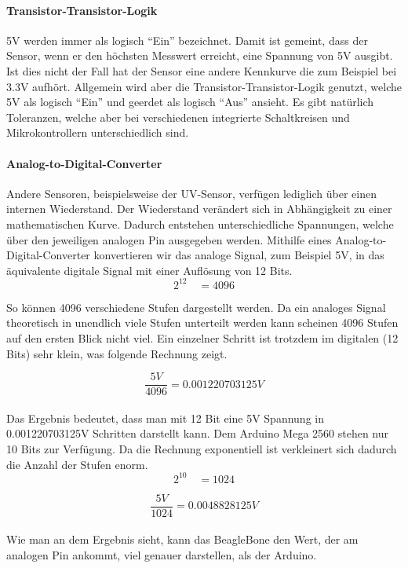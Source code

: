 \paragraph{Transistor-Transistor-Logik}
5V werden immer als logisch ``Ein'' bezeichnet. Damit ist gemeint, dass der Sensor, wenn er den höchsten Messwert erreicht, eine Spannung von 5V ausgibt. Ist dies nicht der Fall hat der Sensor eine andere Kennkurve die zum Beispiel bei 3.3V aufhört. Allgemein wird aber die Transistor-Transistor-Logik genutzt, welche 5V als logisch ``Ein'' und geerdet als logisch ``Aus'' ansieht. Es gibt natürlich Toleranzen, welche aber bei verschiedenen integrierte Schaltkreisen und Mikrokontrollern unterschiedlich sind.

\paragraph{Analog-to-Digital-Converter}
Andere Sensoren, beispielsweise der UV-Sensor, verfügen lediglich über einen internen Wiederstand. Der Wiederstand verändert sich in Abhängigkeit zu einer mathematischen Kurve. Dadurch entstehen unterschiedliche Spannungen, welche über den jeweiligen analogen Pin ausgegeben werden. Mithilfe eines Analog-to-Digital-Converter konvertieren wir das analoge Signal, zum Beispiel 5V, in das äquivalente digitale Signal mit einer Auflösung von 12 Bits. \\

\[
2^{12} \quad = 4096
\]

So können 4096 verschiedene Stufen dargestellt werden. Da ein analoges Signal theoretisch in unendlich viele Stufen unterteilt werden kann scheinen 4096 Stufen auf den ersten Blick nicht viel. Ein einzelner Schritt ist trotzdem im digitalen (12 Bits) sehr klein, was folgende Rechnung zeigt.

\[
\frac{5V}{4096} = 0.001220703125 V
\] \\

Das Ergebnis bedeutet, dass man mit 12 Bit eine 5V Spannung in 0.001220703125V Schritten darstellt kann. Dem Arduino Mega 2560 stehen nur 10 Bits zur Verfügung. Da die Rechnung exponentiell ist verkleinert sich dadurch die Anzahl der Stufen enorm.\\

\[
2^{10} \quad = 1024
\]

\[
\frac{5V}{1024} = 0.0048828125V
\] \\

Wie man an dem Ergebnis sieht, kann das BeagleBone den Wert, der am analogen Pin ankommt, viel genauer darstellen, als der Arduino. 

